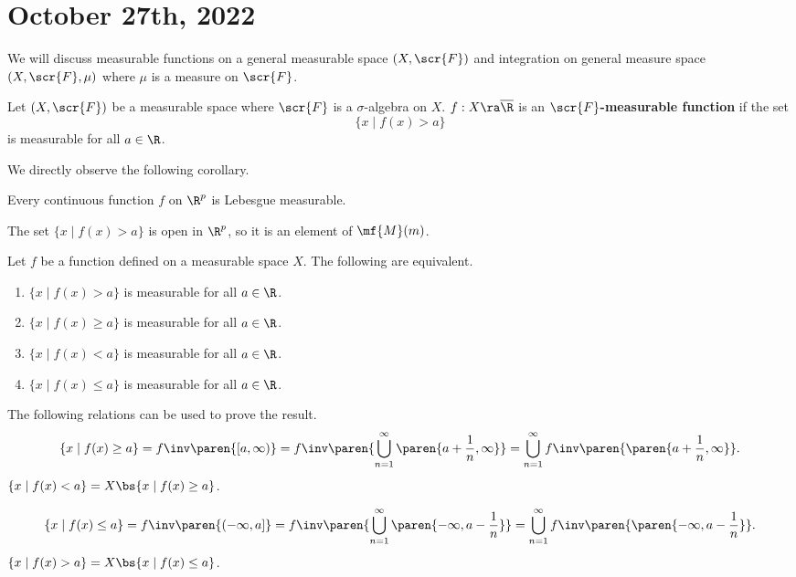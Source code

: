 \section*{October 27th, 2022}

We will discuss measurable functions on a general measurable space \((X, \scr{F})\) and integration on general measure space \((X, \scr{F}, \mu)\) where \(\mu\) is a measure on \(\scr{F}\).

  Let \((X, \scr{F})\) be a measurable space where \(\scr{F}\) is a \(\sigma\)-algebra on \(X\). \(f : X \ra \overline{\R}\) is an \textbf{\(\scr{F}\)-measurable function} if the set
\[
    \{x \mid f(x) > a\}
\]
is measurable for all \(a \in \R\).

We directly observe the following corollary.

\cor Every continuous function \(f\) on \(\R^p\) is Lebesgue measurable.

\pf The set \(\{x \mid f(x) > a\}\) is open in \(\R^p\), so it is an element of \(\mf{M}(m)\).

 Let \(f\) be a function defined on a measurable space \(X\). The following are equivalent.
\begin{enumerate}
    \item \(\{x \mid f(x) > a\}\) is measurable for all \(a \in \R\).
    \item \(\{x \mid f(x) \geq a\}\) is measurable for all \(a \in \R\).
    \item \(\{x \mid f(x) < a\}\) is measurable for all \(a \in \R\).
    \item \(\{x \mid f(x) \leq a\}\) is measurable for all \(a \in \R\).
\end{enumerate}

\pf The following relations can be used to prove the result.\\
 \vspace*{-10px}
\begin{equation*}
    \{x \mid f(x) \geq a\} = f\inv\paren{[a, \infty)} = f\inv\paren{\bigcup_{n=1}^{\infty} \paren{a + \frac{1}{n}, \infty}} = \bigcup_{n=1}^{\infty} f\inv\paren{\paren{a + \frac{1}{n}, \infty}}.
\end{equation*}
 \(\{x \mid f(x) < a\} = X \bs \{x \mid f(x) \geq a\}\).

 \vspace*{-10px}
\[
    \{x \mid f(x) \leq a\} = f\inv \paren{(-\infty, a]} = f\inv\paren{\bigcup_{n=1}^{\infty} \paren{-\infty, a - \frac{1}{n}}} = \bigcup_{n=1}^{\infty} f\inv\paren{\paren{-\infty, a - \frac{1}{n}}}.
\]
 \(\{x \mid f(x) > a\} = X \bs \{x \mid f(x) \leq a\}\).

